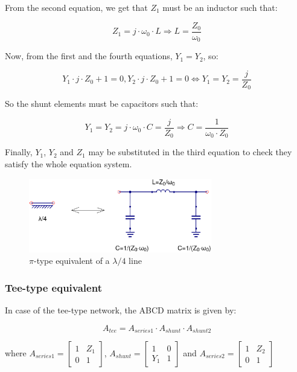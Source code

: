 \noindent From the second equation, we get that $Z_1$ must be an inductor such that:

\begin{equation}
Z_1 = j\cdot \omega_0 \cdot L \Longrightarrow L = \dfrac{Z_0}{\omega_0}
\end{equation}

\noindent Now, from the first and the fourth equations, $Y_1 = Y_2$, so:

\begin{equation}
Y_1 \cdot j \cdot Z_0 + 1 = 0, Y_2 \cdot j \cdot Z_0 + 1 = 0 \iff Y_1 = Y_2 = \dfrac{j}{Z_0}
\end{equation}

\noindent So the shunt elements must be capacitors such that:

\begin{equation}
Y_1 = Y_2 = j \cdot \omega_0 \cdot C = \dfrac{j}{Z_0} \Longrightarrow C = \dfrac{1}{\omega_0 \cdot Z_0}
\end{equation}

\noindent Finally, $Y_1$, $Y_2$ and $Z_1$ may be substituted in the third equation to check they satisfy the whole equation system.

\begin{figure}[ht]
\begin{center}
\includegraphics[width=8cm]{Pi-equivalent-l4}
\end{center}
\caption{$\pi$-type equivalent of a $\lambda/4$ line}
\label{fig:pi-eq-l4}
\end{figure}
\FloatBarrier

\subsubsection{Tee-type equivalent}

\noindent In case of the tee-type network, the ABCD matrix is given by: 

\begin{equation}
A_{tee} = A_{series1} \cdot A_{shunt} \cdot A_{shunt2}
\end{equation}

\noindent where $A_{series1} = \begin{bmatrix} 1 & Z_1  \\ 0 & 1 \end{bmatrix}$, $A_{shunt} = \begin{bmatrix} 1 & 0  \\ Y_1 & 1 \end{bmatrix}$ and $A_{series2} = \begin{bmatrix} 1 & Z_2  \\ 0 & 1 \end{bmatrix}$

